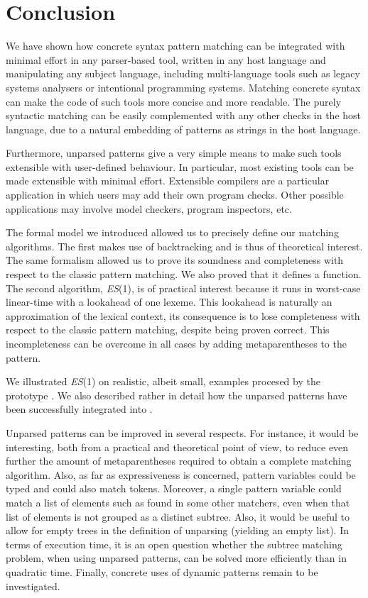 
\section{Conclusion}
\label{concl}

We have shown how concrete syntax pattern matching can be integrated
with minimal effort in any parser\hyp{}based tool, written in any host
language and manipulating any subject language, including
multi\hyp{}language tools such as legacy systems analysers or
intentional programming systems. Matching concrete syntax can make the
code of such tools more concise and more readable.  The purely
syntactic matching can be easily complemented with any other checks in
the host language, due to a natural embedding of patterns as strings
in the host language.

Furthermore, unparsed patterns give a very simple means to make such
tools extensible with user\hyp{}defined behaviour. In particular, most
existing tools can be made extensible with minimal effort. Extensible
compilers are a particular application in which users may add their
own program checks. Other possible applications may involve model
checkers, program inspectors, etc.

The formal model we introduced allowed us to precisely define our
matching algorithms. The first makes use of backtracking and is thus
of theoretical interest. The same formalism allowed us to prove its
soundness and completeness with respect to the classic pattern
matching. We also proved that it defines a function. The second
algorithm, \textit{ES}(1), is of practical interest because it runs in
worst\hyp{}case linear\hyp{}time with a lookahead of one lexeme. This
lookahead is naturally an approximation of the lexical context, its
consequence is to lose completeness with respect to the classic
pattern matching, despite being proven correct. This incompleteness
can be overcome in all cases by adding meta\-parentheses to the
pattern.

We illustrated \textit{ES}(1) on realistic, albeit small, examples
procesed by the prototype \Matchbox. We also described rather in
detail how the unparsed patterns have been successfully integrated
into \GCC.

Unparsed patterns can be improved in several respects. For instance,
it would be interesting, both from a practical and theoretical point
of view, to reduce even further the amount of meta\-parentheses
required to obtain a complete matching algorithm. Also, as far as
expressiveness is concerned, pattern variables could be typed and
could also match tokens. Moreover, a single pattern variable could
match a list of elements such as found in some other matchers, even
when that list of elements is not grouped as a distinct subtree. Also,
it would be useful to allow for empty trees in the definition of
unparsing (yielding an empty list). In terms of execution time, it is
an open question whether the subtree matching problem, when using
unparsed patterns, can be solved more efficiently than in quadratic
time. Finally, concrete uses of dynamic patterns remain to be
investigated.
